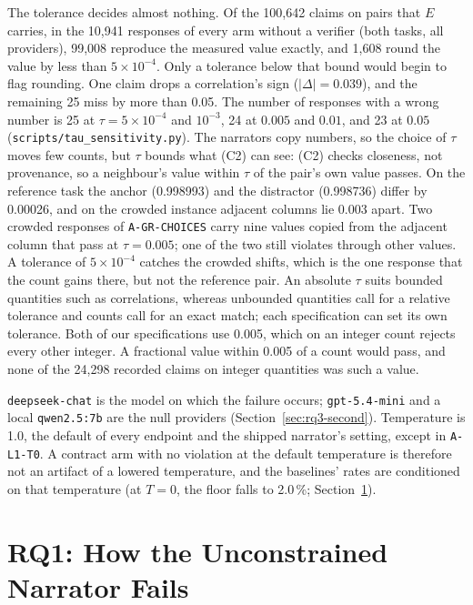 \documentclass[10pt,twocolumn]{article}
\begin{document}
The tolerance decides almost nothing. Of the 100{,}642 claims on pairs that
$E$ carries, in the 10{,}941 responses of every arm without a verifier (both
tasks, all providers), 99{,}008 reproduce the measured value exactly, and
1{,}608 round the value by less than $5\times10^{-4}$. Only a tolerance below
that bound would begin to flag rounding. One claim drops a correlation's sign
($|\Delta| = 0.039$), and the remaining 25 miss by more than 0.05. The number
of responses with a wrong number is 25 at $\tau=5\times10^{-4}$ and
$10^{-3}$, 24 at $0.005$ and $0.01$, and 23 at $0.05$
(\texttt{scripts/tau\_sensitivity.py}). The narrators copy numbers, so the
choice of $\tau$ moves few counts, but $\tau$ bounds what (C2) can see: (C2)
checks closeness, not provenance, so a neighbour's value within $\tau$ of the
pair's own value passes. On the reference task the anchor (0.998993) and the distractor (0.998736)
differ by 0.00026, and on the crowded instance adjacent columns lie 0.003 apart.
Two crowded responses of \texttt{A-GR-CHOICES} carry nine values copied from the
adjacent column that pass at $\tau=0.005$; one of the two still violates through
other values. A tolerance of $5\times10^{-4}$ catches the crowded shifts, which
is the one response that the count gains there, but not the reference pair. An
absolute $\tau$ suits bounded quantities such as correlations, whereas
unbounded quantities call for a relative tolerance and counts call for an exact
match; each specification can set its own tolerance. Both of our
specifications use 0.005, which on an integer count rejects every other
integer. A fractional value within 0.005 of a count would pass, and none of the
24{,}298 recorded claims on integer quantities was such a value.

\texttt{deepseek-chat} is the model on which the failure occurs;
\texttt{gpt-5.4-mini} and a local \texttt{qwen2.5:7b} are the null providers
(Section~\ref{sec:rq3-second}). Temperature is 1.0, the default of every
endpoint and the shipped narrator's setting, except in \texttt{A-L1-T0}. A
contract arm with no violation at the default temperature is therefore not an
artifact of a lowered temperature, and the baselines' rates are conditioned on
that temperature (at $T=0$, the floor falls to 2.0\,\%;
Section~\ref{sec:rq1}).

\section{RQ1: How the Unconstrained Narrator Fails}\label{sec:rq1}
\end{document}
